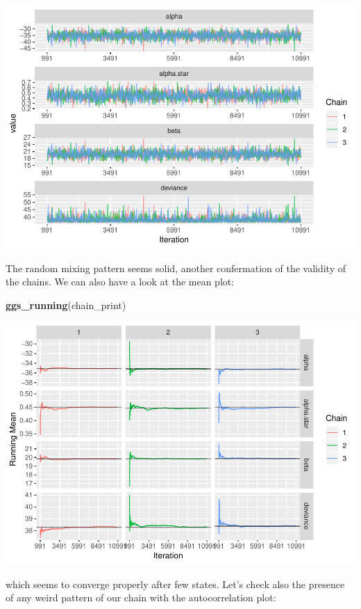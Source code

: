 \documentclass[]{article}
\newenvironment{Shaded}{\begin{snugshade}}{\end{snugshade}}
\newcommand{\KeywordTok}[1]{\textcolor[rgb]{0.13,0.29,0.53}{\textbf{#1}}}
\newcommand{\NormalTok}[1]{#1}
\begin{document}
\includegraphics{FinalProject-SDSII_files/figure-latex/unnamed-chunk-17-1.pdf}

The random mixing pattern seems solid, another confermation of the
validity of the chains. We can also have a look at the mean plot:

\begin{Shaded}
\begin{Highlighting}[]
\KeywordTok{ggs_running}\NormalTok{(chain_print)}
\end{Highlighting}
\end{Shaded}

\includegraphics{FinalProject-SDSII_files/figure-latex/unnamed-chunk-18-1.pdf}

which seems to converge properly after few states. Let's check also the
presence of any weird pattern of our chain with the autocorrelation
plot:
\end{document}
